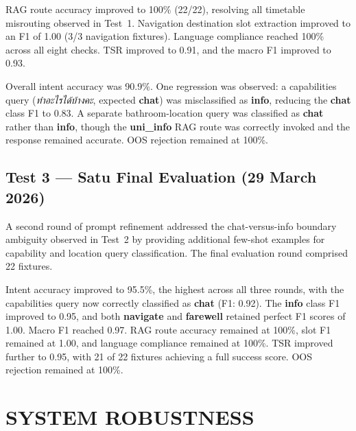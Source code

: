 RAG route accuracy improved to 100\% (22/22), resolving all timetable misrouting observed in Test~1. Navigation destination slot extraction improved to an F1 of 1.00 (3/3 navigation fixtures). Language compliance reached 100\% across all eight checks. TSR improved to 0.91, and the macro F1 improved to 0.93.

Overall intent accuracy was 90.9\%. One regression was observed: a capabilities query (\textit{ทำอะไรได้บ้างคะ}, expected \textbf{chat}) was misclassified as \textbf{info}, reducing the \textbf{chat} class F1 to 0.83. A separate bathroom-location query was classified as \textbf{chat} rather than \textbf{info}, though the \textbf{uni\_info} RAG route was correctly invoked and the response remained accurate. OOS rejection remained at 100\%.

\subsection{Test 3 — Satu Final Evaluation (29 March 2026)}

A second round of prompt refinement addressed the chat-versus-info boundary ambiguity observed in Test~2 by providing additional few-shot examples for capability and location query classification. The final evaluation round comprised 22 fixtures.

Intent accuracy improved to 95.5\%, the highest across all three rounds, with the capabilities query now correctly classified as \textbf{chat} (F1: 0.92). The \textbf{info} class F1 improved to 0.95, and both \textbf{navigate} and \textbf{farewell} retained perfect F1 scores of 1.00. Macro F1 reached 0.97. RAG route accuracy remained at 100\%, slot F1 remained at 1.00, and language compliance remained at 100\%. TSR improved further to 0.95, with 21 of 22 fixtures achieving a full success score. OOS rejection remained at 100\%.

\section{SYSTEM ROBUSTNESS}

